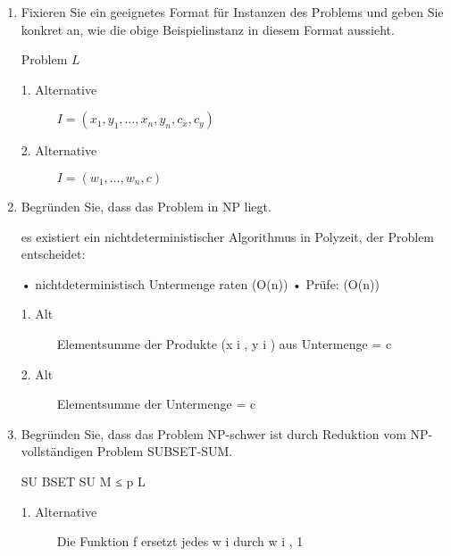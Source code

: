 \documentclass{lehramt-informatik-aufgabe}
\begin{document}
\begin{enumerate}


\item Fixieren Sie ein geeignetes Format für Instanzen des Problems und
geben Sie konkret an, wie die obige Beispielinstanz in diesem Format
aussieht.

\begin{liAntwort}
Problem $L$
\begin{description}
\item[1. Alternative]
$I = (x_1 , y_1 , \dots , x_n , y_n , c_x , c_y )$

\item[2. Alternative]
$I = (w_1 , \dots , w_n , c)$
\end{description}
\end{liAntwort}


\item Begründen Sie, dass das Problem in NP liegt.

\begin{liAntwort}
es existiert ein nichtdeterministischer Algorithmus in Polyzeit, der Problem entscheidet:

• nichtdeterministisch Untermenge raten (O(n))
• Prüfe: (O(n))
\begin{description}
\item[1. Alt]

Elementsumme der Produkte (x i , y i ) aus Untermenge = c

\item[2. Alt]

Elementsumme der Untermenge = c
\end{description}
\end{liAntwort}


\item Begründen Sie, dass das Problem NP-schwer ist durch Reduktion vom
NP-vollständigen Problem SUBSET-SUM.

\begin{liAntwort}
SU BSET SU M ≤ p L

\begin{description}

%

\item[1. Alternative]

Die Funktion f ersetzt jedes w i durch w i , 1


\end{description}
\end{liAntwort}
\end{enumerate}
\end{document}
